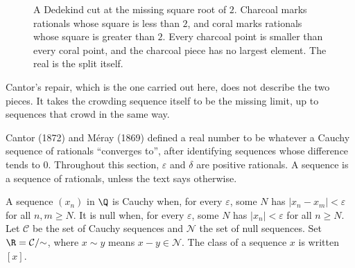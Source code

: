 \begin{figure}[ht]
\centering
{}
\caption{A Dedekind cut at the missing square root of $2$. Charcoal marks rationals whose square is less than $2$, and coral marks rationals whose square is greater than $2$. Every charcoal point is smaller than every coral point, and the charcoal piece has no largest element. The real is the split itself.}
\label{fig:rw-cut}
\end{figure}

Cantor's repair, which is the one carried out here, does not describe the two pieces. It takes the crowding sequence itself to be the missing limit, up to sequences that crowd in the same way.

Cantor (1872) and M\'eray (1869) defined a real number to be whatever a Cauchy sequence of rationals ``converges to'', after identifying sequences whose difference tends to $0$. Throughout this section, $\varepsilon$ and $\delta$ are positive rationals. A sequence is a sequence of rationals, unless the text says otherwise.

\begin{definition}
A sequence $(x_n)$ in $\Q$ is Cauchy when, for every $\varepsilon$, some $N$ has $|x_n-x_m|<\varepsilon$ for all $n,m\ge N$. It is null when, for every $\varepsilon$, some $N$ has $|x_n|<\varepsilon$ for all $n\ge N$. Let $\mathcal C$ be the set of Cauchy sequences and $\mathcal N$ the set of null sequences. Set $\R=\mathcal C/{\sim}$, where $x\sim y$ means $x-y\in\mathcal N$. The class of a sequence $x$ is written $[x]$.
\end{definition}

